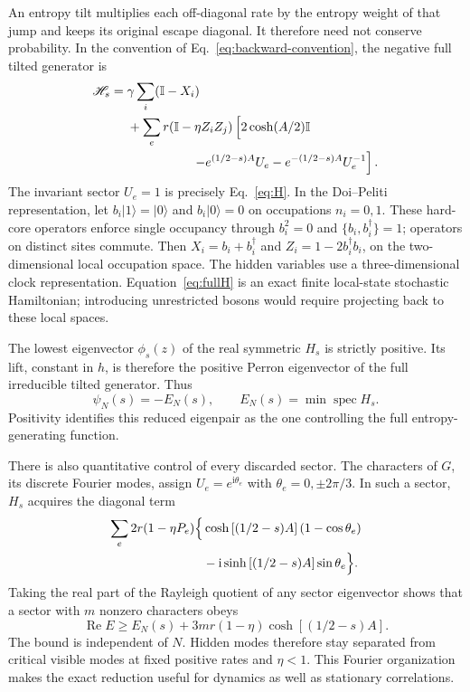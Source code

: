 \documentclass[aps,pre,reprint,amsmath,amssymb,longbibliography,floatfix]{revtex4-2}
\newcommand{\Id}{\mathbb I}
\begin{document}
An entropy tilt multiplies each off-diagonal rate by the entropy weight
of that jump and keeps its original escape diagonal. It therefore need
not conserve probability. In the convention of Eq.~\eqref{eq:backward-convention},
the negative full tilted generator is
\begin{equation}
 \begin{split}
 \mathscr H_s={}&\gamma\sum_i(\Id-X_i)\\
 &+\sum_e r(\Id-\eta Z_i Z_j)\left[\vphantom{e^{-(1/2-s)A}U_e^{-1}}2\cosh(A/2)\Id\right.\\
 &\hspace{18mm}\left.-e^{(1/2-s)A}U_e-e^{-(1/2-s)A}U_e^{-1}\right].
 \end{split}
 \label{eq:fullH}
\end{equation}
The invariant sector $U_e=1$ is precisely Eq.~\eqref{eq:H}.
 In the Doi--Peliti representation, let $b_i|1\rangle=|0\rangle$ and
$b_i|0\rangle=0$ on occupations $n_i=0,1$. These hard-core operators
enforce single occupancy through $b_i^2=0$ and
$\{b_i,b_i^\dagger\}=1$; operators on distinct sites commute. Then $X_i=b_i+b_i^\dagger$ and
$Z_i=1-2b_i^\dagger b_i$, on the two-dimensional local occupation space.
The hidden variables use a three-dimensional clock representation.
Equation~\eqref{eq:fullH} is an exact finite local-state stochastic
Hamiltonian; introducing unrestricted bosons would require projecting
back to these local spaces.

The lowest eigenvector $\phi_s(z)$ of the real symmetric $H_s$ is strictly
positive. Its lift, constant in $h$, is therefore the positive Perron
eigenvector of the full irreducible tilted generator. Thus
\begin{equation}
 \psi_N(s)=-E_N(s),\qquad E_N(s)=\min\operatorname{spec}H_s.
 \label{eq:perron}
\end{equation}
Positivity identifies this reduced eigenpair as the one controlling the
full entropy-generating function.

There is also quantitative control of every discarded sector. The
characters of $G$, its discrete Fourier modes, assign $U_e=e^{\mathrm i\theta_e}$ with
$\theta_e=0,\pm2\pi/3$. In such a sector, $H_s$ acquires the diagonal term
\begin{equation}
 \begin{split}
 \sum_e2r(1-\eta P_e)\Bigl\{&\cosh\left[(1/2-s)A\right](1-\cos\theta_e)\\
 &-\mathrm i\sinh\left[(1/2-s)A\right]\sin\theta_e\Bigr\}.
 \end{split}
 \label{eq:sectors}
\end{equation}
Taking the real part of the Rayleigh quotient of any sector eigenvector
shows that a sector with $m$ nonzero characters obeys
\begin{equation}
 \operatorname{Re} E\geq E_N(s)+
 3m r(1-\eta)\cosh\left[(1/2-s)A\right].
 \label{eq:hiddengap}
\end{equation}
The bound is independent of $N$. Hidden modes therefore stay separated
from critical visible modes at fixed positive rates and $\eta<1$.
This Fourier organization makes the exact reduction useful for dynamics
as well as stationary correlations.
\end{document}
